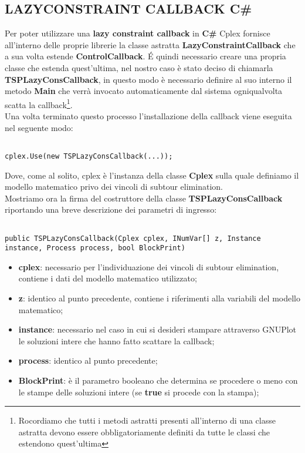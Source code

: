 \documentclass[11pt]{article}
\begin{document}
\subsection*{LAZYCONSTRAINT CALLBACK C\#}
\label{sec:LazyS}

Per poter utilizzare una \textbf{lazy constraint callback} in \textbf{C\#} Cplex fornisce all'interno delle proprie librerie la classe astratta \textbf{LazyConstraintCallback} che a sua volta estende \textbf{ControlCallback}. \'E quindi necessario creare una propria classe che estenda quest'ultima, nel nostro caso è stato deciso di chiamarla \textbf{TSPLazyConsCallback}, in questo modo è necessario definire al suo interno il metodo \textbf{Main} che verrà invocato automaticamente dal sistema ogniqualvolta scatta la callback\footnote{Rocordiamo che tutti i metodi astratti presenti all'interno di una classe astratta devono essere obbligatoriamente definiti da tutte le classi che estendono quest'ultima}.\\
Una volta terminato questo processo l'installazione della callback viene eseguita nel seguente modo:

\begin{lstlisting}

cplex.Use(new TSPLazyConsCallback(...));

\end{lstlisting}

Dove, come al solito, cplex è l'instanza della classe \textbf{Cplex} sulla quale definiamo il modello matematico privo dei vincoli di subtour elimination.\\
Mostriamo ora la firma del costruttore della classe \textbf{TSPLazyConsCallback} riportando una breve descrizione dei parametri di ingresso:

\begin{lstlisting}

public TSPLazyConsCallback(Cplex cplex, INumVar[] z, Instance instance, Process process, bool BlockPrint)

\end{lstlisting}

\begin{itemize}
    \item \textbf{cplex}: necessario per l'individuazione dei vincoli di subtour elimination, contiene i dati del modello matematico utilizzato;
    \item \textbf{z}: identico al punto precedente, contiene i riferimenti alla variabili del modello matematico;
    \item \textbf{instance}: necessario nel caso in cui si desideri stampare attraverso GNUPlot le soluzioni intere che hanno fatto scattare la callback;
    \item \textbf{process}: identico al punto precedente;
    \item \textbf{BlockPrint}: è il parametro booleano che determina se procedere o meno con le stampe delle soluzioni intere (se \textbf{true} si procede con la stampa);
\end{itemize}
\end{document}
